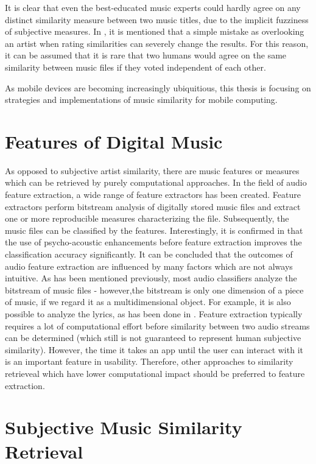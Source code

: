 It is clear that even the best-educated music experts could hardly agree on 
any distinct similarity measure between two music titles, due to the implicit fuzziness of subjective measures. In \cite{Ellis02thequest}, it is mentioned that a simple mistake as overlooking an artist when rating similarities can severely change the results. For this reason, it can be assumed that it is rare that two humans would agree on the same similarity between music files
if they voted independent of each other.

As mobile devices are becoming increasingly ubiquitious, this thesis is focusing on strategies and implementations of music similarity for mobile computing.

\section{Features of Digital Music}

As opposed to subjective artist similarity, there are music features or measures which can be retrieved by purely computational approaches. In the field of audio feature extraction, a wide range of feature extractors has been created. Feature extractors perform bitstream analysis of digitally stored music files and extract one or more reproducible measures characterizing the file. Subsequently, the music files can be classified by the features. Interestingly, it is confirmed in \cite{LID_05ismir} that the use of psycho-acoustic enhancements before feature extraction improves the classification accuracy significantly. It can be concluded that the outcomes of audio feature extraction are influenced by many factors which are not always intuitive.
As has been mentioned previously, most audio classifiers analyze the bitstream of music files - however,the bitstream is only one dimension of a piece of music, if we regard it as a multidimensional object. For example, it is also possible to analyze the lyrics, as has been done in \cite{DBLP:conf/ismir/MayerNR08}. Feature extraction typically requires a lot of computational effort before similarity between two audio streams can be determined (which still is not guaranteed to represent human subjective similarity). However, the time it takes an app until the user can interact with it is an important feature in usability. Therefore, other approaches to similarity retrieveal which have lower computational impact should be preferred to feature extraction.

\section{Subjective Music Similarity Retrieval}


